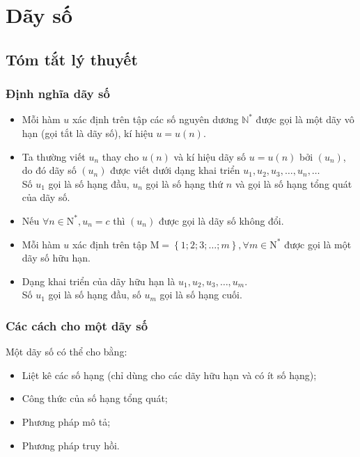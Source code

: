 
\setcounter{section}{4}
\setcounter{dang}{0}
\setcounter{ex}{0}
\setcounter{bt}{0}
\setcounter{vd}{0}
\section{Dãy số}
\subsection{Tóm tắt lý thuyết}
\begin{tomtat}
	\subsubsection{Định nghĩa dãy số} 
	\begin{itemize}
		\item Mỗi hàm $u$ xác định trên tập các số nguyên dương $\mathbb{N^{*}}$ được gọi là một dãy vô hạn (gọi tắt là dãy số), kí hiệu $u=u(n)$.
		\item 	Ta thường viết $u_n$ thay cho $u(n)$ và kí hiệu dãy số $u=u(n)$ bởi $(u_n)$, do đó dãy số $(u_n)$ được viết dưới dạng khai triển $u_1, u_2, u_3, \ldots, u_n, \ldots$\\
		Số $u_1$ gọi là số hạng đầu, $u_n$ gọi là số hạng thứ $n$ và gọi là số hạng tổng quát của dãy số.
		\item Nếu $\forall n \in \mathrm{N^*}, u_n=c$ thì $(u_n)$ được gọi là dãy số không đổi.
		\item Mỗi hàm $u$ xác định trên tập $\mathrm{M}=\left\{1;2;3;\ldots;m\right\}, \forall m \in \mathrm{N^*}$ được gọi là một dãy số hữu hạn.
		\item Dạng khai triển của dãy hữu hạn là $u_1, u_2, u_3, \ldots, u_m$.\\
		Số $u_1$ gọi là số hạng đầu, số $u_m$ gọi là số hạng cuối.
		
	\end{itemize}
	\subsubsection{Các cách cho một dãy số}
	Một dãy số có thể cho bằng:
	\begin{itemize}
		\item Liệt kê các số hạng (chỉ dùng cho các dãy hữu hạn và có ít số hạng);
		\item Công thức của số hạng tổng quát;
		\item Phương pháp mô tả;
		\item Phương pháp truy hồi.
	\end{itemize}

\end{tomtat}
